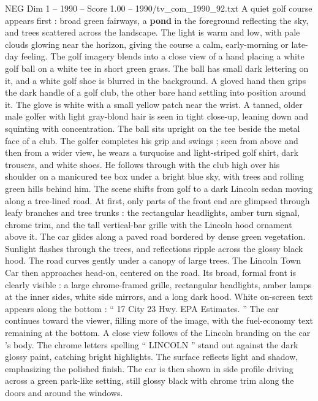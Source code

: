 \begin{textsample}{NEG Dim 1 – 1990 – Score 1.00 – 1990/tv\_com\_1990\_92.txt}  \label{ex:f1_neg_059}
A quiet golf course appears first : broad green fairways, a \textbf{pond} in the foreground reflecting the sky, and trees scattered across the landscape.
The light is warm and low, with pale clouds glowing near the horizon, giving the course a calm, early-morning or late-day feeling.
The golf imagery blends into a close view of a hand placing a white golf ball on a white tee in short green grass.
The ball has small dark lettering on it, and a white golf shoe is blurred in the background.
A gloved hand then grips the dark handle of a golf club, the other bare hand settling into position around it.
The glove is white with a small yellow patch near the wrist.
A tanned, older male golfer with light gray-blond hair is seen in tight close-up, leaning down and squinting with concentration.
The ball sits upright on the tee beside the metal face of a club.
The golfer completes his grip and swings ; seen from above and then from a wider view, he wears a turquoise and light-striped golf shirt, dark trousers, and white shoes.
He follows through with the club high over his shoulder on a manicured tee box under a bright blue sky, with trees and rolling green hills behind him.
The scene shifts from golf to a dark Lincoln sedan moving along a tree-lined road.
At first, only parts of the front end are glimpsed through leafy branches and tree trunks : the rectangular headlights, amber turn signal, chrome trim, and the tall vertical-bar grille with the Lincoln hood ornament above it.
The car glides along a paved road bordered by dense green vegetation.
Sunlight flashes through the trees, and reflections ripple across the glossy black hood.
The road curves gently under a canopy of large trees.
The Lincoln Town Car then approaches head-on, centered on the road.
Its broad, formal front is clearly visible : a large chrome-framed grille, rectangular headlights, amber lamps at the inner sides, white side mirrors, and a long dark hood.
White on-screen text appears along the bottom : “ 17 City 23 Hwy.
EPA Estimates. ” The car continues toward the viewer, filling more of the image, with the fuel-economy text remaining at the bottom.
A close view follows of the Lincoln branding on the car ’s body.
The chrome letters spelling “ LINCOLN ” stand out against the dark glossy paint, catching bright highlights.
The surface reflects light and shadow, emphasizing the polished finish.
The car is then shown in side profile driving across a green park-like setting, still glossy black with chrome trim along the doors and around the windows.

\end{textsample}
